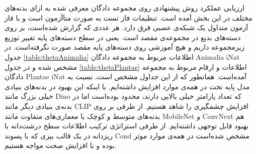 ارزیابی عملکرد روش پیشنهادی روی مجموعه دادگان معرفی شده به ازای بدنه‌های مختلف در این بخش آمده است. تنظیمات فاز تست به صورت متا‌آزمون است و با فاز آزمون متداول یک شبکه‌ی عصبی فرق دارد. هر عددی که گزارش شده‌است، بر روی دسته‌های بدیع در مجموعه‌ی مقصد است. یعنی در سطح دسته‌های پایه تغییر توزیع زیرمجموعه داریم و هیچ آموزشی روی دسته‌های پایه مقصد صورت نگرفته‌است. در جدول 
\ref{table:thetaAnimalia}
اطلاعات مربوط به مجموعه دادگان Animalia iNat مشخص شده و در جدول 
\ref{table:thetaPlantae}
اطلاعات و ارقام مربوط به مجموعه دادگان Plantae iNat آمده‌است. همانطور که از این جداول مشخص است، نسبت به مدل پایه تخت در همه‌ی موارد افزایش داشته‌ایم. با اینکه این بهبود در بدنه‌های بنیادی خیلی بزرگ مانند Dino که تعداد پارامتر خیلی بالایی دارند، محدود بوده‌است اما در بدنه‌ی بنیادی دیگر مانند CLIP افزایش چشمگیری را شاهد هستیم. از طرفی بر روی بدنه‌های متوسط و کوچک با معماری‌های متفاوت مانند MobileNet و ConvNext هم بهبود قابل توجهی داشته‌ایم. از طرفی استراتژی ترکیب اطلاعات سطح درشت‌دانه با ریزدانه در یک قالب بیزی که با پسوند Cond مشخص شده‌است در همه‌ی موارد موثر بوده و با افزایش صحت مواجه هستیم.

